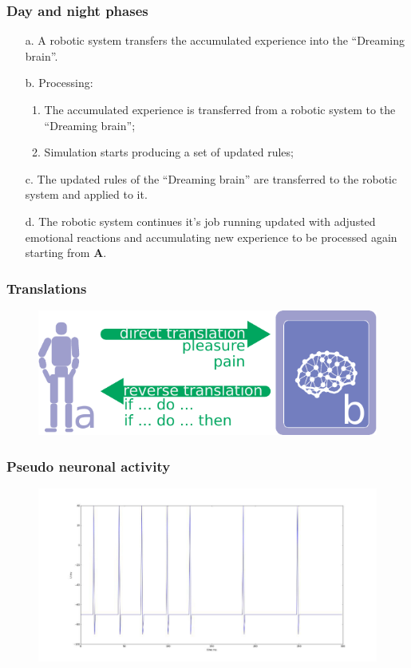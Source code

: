 \documentclass[12pt, aspectratio=169]{beamer}
\begin{document}
\begin{frame}
\frametitle{Day and night phases}

\begin{enumerate}
  \item[a.] A robotic system transfers the accumulated experience into the ``Dreaming brain''.
  \item[b.] Processing:
      \begin{enumerate}
      \item The accumulated experience is transferred from a robotic system to the ``Dreaming brain'';
      \item Simulation starts producing a set of updated rules;
      \end{enumerate}
  \item[c.] The updated rules of the ``Dreaming brain'' are transferred to the robotic system and applied to it.
  \item[d.] The robotic system continues it's job running updated with adjusted emotional reactions and accumulating new experience to be processed again starting from \textbf{A}.
  \end{enumerate}

\end{frame}


\begin{frame}
  \frametitle{Translations}

  \begin{figure}
    \includegraphics[width=0.8\linewidth]{reverse_translation}
  \end{figure}
  
\end{frame}


\begin{frame}
\frametitle{Pseudo neuronal activity}
\begin{figure}
\includegraphics[width=1.0\textwidth]{pseudo-neuronal-activity}
\end{figure}
\end{frame}
\end{document}
